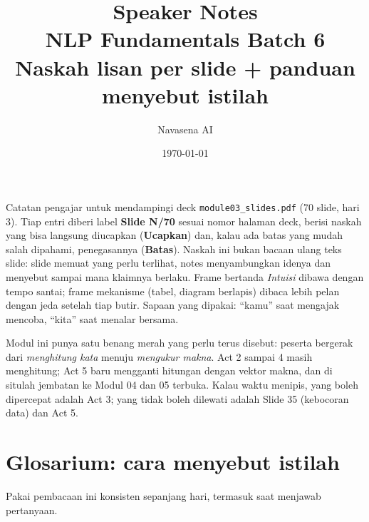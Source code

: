 \documentclass[11pt]{article}
\title{\textbf{Speaker Notes}\\[2mm]\large NLP Fundamentals \textperiodcentered{} Batch 6\\[1mm]\normalsize Naskah lisan per slide + panduan menyebut istilah}
\author{Navasena AI}
\date{\today}
\begin{document}
\maketitle
\thispagestyle{empty}

\noindent Catatan pengajar untuk mendampingi deck \texttt{module03\_slides.pdf} (70 slide, hari 3). Tiap entri diberi label \textbf{Slide N/70} sesuai nomor halaman deck, berisi naskah yang bisa langsung diucapkan (\textbf{Ucapkan}) dan, kalau ada batas yang mudah salah dipahami, penegasannya (\textbf{Batas}). Naskah ini bukan bacaan ulang teks slide: slide memuat yang perlu terlihat, notes menyambungkan idenya dan menyebut sampai mana klaimnya berlaku. Frame bertanda \emph{Intuisi} dibawa dengan tempo santai; frame mekanisme (tabel, diagram berlapis) dibaca lebih pelan dengan jeda setelah tiap butir. Sapaan yang dipakai: ``kamu'' saat mengajak mencoba, ``kita'' saat menalar bersama.

Modul ini punya satu benang merah yang perlu terus disebut: peserta bergerak dari \emph{menghitung kata} menuju \emph{mengukur makna}. Act 2 sampai 4 masih menghitung; Act 5 baru mengganti hitungan dengan vektor makna, dan di situlah jembatan ke Modul 04 dan 05 terbuka. Kalau waktu menipis, yang boleh dipercepat adalah Act 3; yang tidak boleh dilewati adalah Slide 35 (kebocoran data) dan Act 5.

\vspace{4mm}
\section*{Glosarium: cara menyebut istilah}
Pakai pembacaan ini konsisten sepanjang hari, termasuk saat menjawab pertanyaan.
\end{document}
